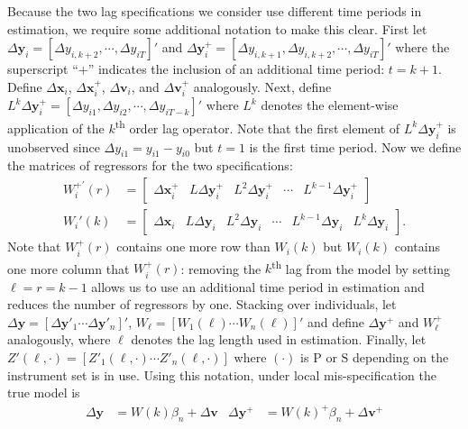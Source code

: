 Because the two lag specifications we consider use different time periods in estimation, we require some additional notation to make this clear. 
First let
$\Delta \mathbf{y}_{i} = [\Delta y_{i,k+2}, \cdots, \Delta y_{iT}]'$ and $\Delta \mathbf{y}^+_{i} = [\Delta y_{i,k+1}, \Delta y_{i,k+2}, \cdots, \Delta y_{iT}]'$ 
where the superscript ``+'' indicates the inclusion of an additional time period: $t = k+1$.
Define $\Delta \mathbf{x}_i$, $\Delta \mathbf{x}_{i}^{+}$, $\Delta \mathbf{v}_i$, and $\Delta \mathbf{v}_{i}^{+}$ analogously.
Next, define $L^k\Delta \mathbf{y}_i^{+} = [\Delta y_{i1}, \Delta y_{i2}, \cdots, \Delta y_{iT-k}]'$ where $L^k$ denotes the element-wise application of the $k$\textsuperscript{th} order lag operator.
Note that the first element of $L^k\Delta \mathbf{y}_{i}^{+}$ is unobserved since $\Delta y_{i1} = y_{i1} - y_{i0}$ but $t=1$ is the first time period.
Now we define the matrices of regressors for the two specifications: 
\begin{align*}
  W_i^{+'}(r) &= \left[
  \begin{array}{ccccc}
    \Delta \mathbf{x}_i^+ & L \Delta \mathbf{y}_i^{+} &  L^2 \Delta \mathbf{y}_i^{+} & \cdots & L^{k-1}\Delta \mathbf{y}_i^{+} 
  \end{array}
\right]\\
  W_i'(k) &= \left[
  \begin{array}{cccccc}
    \Delta \mathbf{x}_i & L \Delta \mathbf{y}_i &  L^2 \Delta \mathbf{y}_i & \cdots & L^{k-1}\Delta \mathbf{y}_i & L^k\Delta \mathbf{y}_i 
  \end{array}
\right].
\end{align*}
Note that $W_i^{+}(r)$ contains one more row than $W_i(k)$ but $W_i(k)$ contains one more column that $W_i^{+}(r)$: removing the $k$\textsuperscript{th} lag from the model by setting $\ell = r = k-1$ allows us to use an additional time period in estimation and reduces the number of regressors by one. 
Stacking over individuals, let $\Delta \mathbf{y} = [\Delta \mathbf{y}'_1 \cdots \Delta \mathbf{y}'_n]'$, $W_\ell = [W_1(\ell) \cdots W_n(\ell)]'$ and define $\Delta \mathbf{y}^{+}$ and $W_\ell^{+}$ analogously, where $\ell$ denotes the lag length used in estimation.
Finally, let $Z'(\ell,\cdot) = [Z'_1(\ell,\cdot) \cdots Z'_n(\ell,\cdot)]$ where $(\cdot)$ is $\text{P}$ or $\text{S}$ depending on the instrument set is in use.
Using this notation, under local mis-specification the true model is
\begin{align}
  \Delta \mathbf{y} &= W(k)\beta_n + \Delta \mathbf{v} &  \Delta \mathbf{y}^{+} &= W(k)^{+}\beta_n + \Delta \mathbf{v}^+
\end{align}
